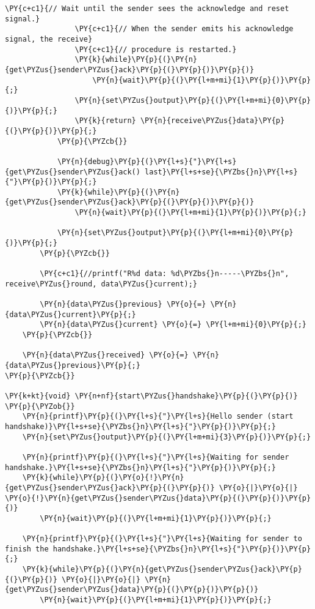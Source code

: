 \begin{Verbatim}[commandchars=\\\{\}]
                \PY{c+c1}{// Wait until the sender sees the acknowledge and reset signal.}
                \PY{c+c1}{// When the sender emits his acknowledge signal, the receive}
                \PY{c+c1}{// procedure is restarted.}
                \PY{k}{while}\PY{p}{(}\PY{n}{get\PYZus{}sender\PYZus{}ack}\PY{p}{(}\PY{p}{)}\PY{p}{)}
                    \PY{n}{wait}\PY{p}{(}\PY{l+m+mi}{1}\PY{p}{)}\PY{p}{;}
                \PY{n}{set\PYZus{}output}\PY{p}{(}\PY{l+m+mi}{0}\PY{p}{)}\PY{p}{;}
                \PY{k}{return} \PY{n}{receive\PYZus{}data}\PY{p}{(}\PY{p}{)}\PY{p}{;}
            \PY{p}{\PYZcb{}}

            \PY{n}{debug}\PY{p}{(}\PY{l+s}{"}\PY{l+s}{get\PYZus{}sender\PYZus{}ack() last}\PY{l+s+se}{\PYZbs{}n}\PY{l+s}{"}\PY{p}{)}\PY{p}{;}
            \PY{k}{while}\PY{p}{(}\PY{n}{get\PYZus{}sender\PYZus{}ack}\PY{p}{(}\PY{p}{)}\PY{p}{)}
                \PY{n}{wait}\PY{p}{(}\PY{l+m+mi}{1}\PY{p}{)}\PY{p}{;}

            \PY{n}{set\PYZus{}output}\PY{p}{(}\PY{l+m+mi}{0}\PY{p}{)}\PY{p}{;}
        \PY{p}{\PYZcb{}}

        \PY{c+c1}{//printf("R%d data: %d\PYZbs{}n-----\PYZbs{}n", receive\PYZus{}round, data\PYZus{}current);}

        \PY{n}{data\PYZus{}previous} \PY{o}{=} \PY{n}{data\PYZus{}current}\PY{p}{;}
        \PY{n}{data\PYZus{}current} \PY{o}{=} \PY{l+m+mi}{0}\PY{p}{;}
    \PY{p}{\PYZcb{}}

    \PY{n}{data\PYZus{}received} \PY{o}{=} \PY{n}{data\PYZus{}previous}\PY{p}{;}
\PY{p}{\PYZcb{}}

\PY{k+kt}{void} \PY{n+nf}{start\PYZus{}handshake}\PY{p}{(}\PY{p}{)} \PY{p}{\PYZob{}}
    \PY{n}{printf}\PY{p}{(}\PY{l+s}{"}\PY{l+s}{Hello sender (start handshake)}\PY{l+s+se}{\PYZbs{}n}\PY{l+s}{"}\PY{p}{)}\PY{p}{;}
    \PY{n}{set\PYZus{}output}\PY{p}{(}\PY{l+m+mi}{3}\PY{p}{)}\PY{p}{;}

    \PY{n}{printf}\PY{p}{(}\PY{l+s}{"}\PY{l+s}{Waiting for sender handshake.}\PY{l+s+se}{\PYZbs{}n}\PY{l+s}{"}\PY{p}{)}\PY{p}{;}
    \PY{k}{while}\PY{p}{(}\PY{o}{!}\PY{n}{get\PYZus{}sender\PYZus{}ack}\PY{p}{(}\PY{p}{)} \PY{o}{|}\PY{o}{|} \PY{o}{!}\PY{n}{get\PYZus{}sender\PYZus{}data}\PY{p}{(}\PY{p}{)}\PY{p}{)}
        \PY{n}{wait}\PY{p}{(}\PY{l+m+mi}{1}\PY{p}{)}\PY{p}{;}

    \PY{n}{printf}\PY{p}{(}\PY{l+s}{"}\PY{l+s}{Waiting for sender to finish the handshake.}\PY{l+s+se}{\PYZbs{}n}\PY{l+s}{"}\PY{p}{)}\PY{p}{;}
    \PY{k}{while}\PY{p}{(}\PY{n}{get\PYZus{}sender\PYZus{}ack}\PY{p}{(}\PY{p}{)} \PY{o}{|}\PY{o}{|} \PY{n}{get\PYZus{}sender\PYZus{}data}\PY{p}{(}\PY{p}{)}\PY{p}{)}
        \PY{n}{wait}\PY{p}{(}\PY{l+m+mi}{1}\PY{p}{)}\PY{p}{;}


\end{Verbatim}
